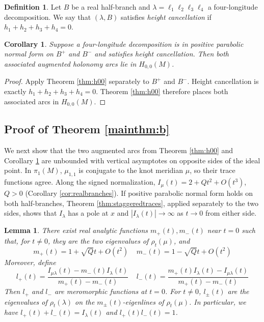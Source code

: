 \documentclass{article}
\theoremstyle{plain}
\theoremstyle{definition}
\newtheorem{definition}[theorem]{Definition}
\theoremstyle{plain}
\theoremstyle{plain}
\newtheorem{corollary}[theorem]{Corollary}
\theoremstyle{plain}
\newtheorem{lemma}[theorem]{Lemma}
\theoremstyle{remark}
\theoremstyle{remark}
\theoremstyle{plain}
\theoremstyle{plain}
\newcounter{main}
\theoremstyle{plain}
\theoremstyle{plain}
\begin{document}
\begin{definition}\label{def:heightcancellation}
Let $B$ be a real half-branch and $\lambda = \ell_1\ell_2\ell_3\ell_4$ a four-longitude decomposition. We say that $(\lambda, B)$ satisfies \emph{height cancellation} if $h_1 + h_2 + h_3 + h_4 = 0$.
\end{definition}

\begin{corollary}\label{cor:h00}
Suppose a four-longitude decomposition is in positive parabolic normal form on $B^+$ and $B^-$ and satisfies height cancellation. Then both associated augmented holonomy arcs lie in $H_{0,0}(M)$.
\end{corollary}

\begin{proof}
Apply Theorem \ref{thm:h00} separately to $B^+$ and $B^-$. Height cancellation is exactly $h_1+h_2+h_3+h_4=0$. Theorem \ref{thm:h00} therefore places both associated arcs in $H_{0,0}(M)$.
\end{proof}

\subsection{Proof of Theorem \ref{mainthm:b}}

We next show that the two augmented arcs from Theorem \ref{thm:h00} and Corollary \ref{cor:h00} are unbounded with vertical asymptotes on opposite sides of the ideal point. In $\pi_1(M)$, $\mu_{1,1}$ is conjugate to the knot meridian $\mu$, so their trace functions agree. Along the signed normalization, $I_\mu(t)=2+Qt^2+O(t^3)$, $Q>0$ (Corollary \ref{cor:realbranches}). If positive parabolic normal form holds on both half-branches, Theorem \ref{thm:staggeredtraces}, applied separately to the two sides, shows that $I_\lambda$ has a pole at $x$ and $|I_\lambda(t)|\to \infty$ as $t\to0$ from either side.

\begin{lemma}\label{lma:eigenvalues}
There exist real analytic functions $m_+(t), m_-(t)$ near $t = 0$ such that, for $t \neq 0$, they are the two eigenvalues of $\rho_t(\mu)$, and 
\begin{equation*}
	m_+(t) = 1 + \sqrt{Q}t + O(t^2) \ \ \ \ \ m_-(t) = 1 - \sqrt{Q}t + O(t^2)
\end{equation*}
Moreover, define 
\begin{equation*}
	l_+(t) = \frac{I_{\mu\lambda}(t) - m_-(t)I_\lambda(t)}{m_+(t) - m_-(t)} \ \ \ \ \ l_-(t) = \frac{m_+(t)I_\lambda(t) - I_{\mu\lambda}(t)}{m_+(t) - m_-(t)}
\end{equation*}
Then $l_+$ and $l_-$ are meromorphic functions at $t = 0$. For $t \neq 0$, $l_{\pm}(t)$ are the eigenvalues of $\rho_t(\lambda)$ on the $m_{\pm}(t)$-eigenlines of $\rho_t(\mu)$. In particular, we have $l_+(t) + l_-(t) = I_\lambda(t)$ and $l_+(t)l_-(t) = 1$.
\end{lemma}
\end{document}
